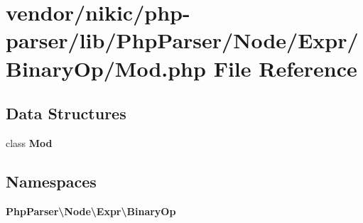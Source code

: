 \section{vendor/nikic/php-\/parser/lib/\+Php\+Parser/\+Node/\+Expr/\+Binary\+Op/\+Mod.php File Reference}
\label{_binary_op_2_mod_8php}
\subsection*{Data Structures}
\begin{DoxyCompactItemize}
\item 
class {\bf Mod}
\end{DoxyCompactItemize}
\subsection*{Namespaces}
\begin{DoxyCompactItemize}
\item 
 {\bf Php\+Parser\textbackslash{}\+Node\textbackslash{}\+Expr\textbackslash{}\+Binary\+Op}
\end{DoxyCompactItemize}
